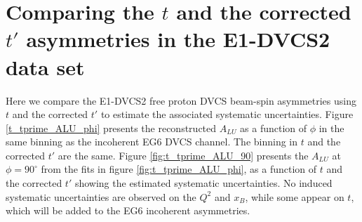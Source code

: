\documentclass[a4paper,11pt,twoside]{article}
\begin{document}
\section{Comparing the $t$ and the corrected $t'$ asymmetries in the E1-DVCS2 
data set}
Here we compare the E1-DVCS2 free proton DVCS beam-spin asymmetries using $t$ 
and the corrected $t'$ to estimate the associated systematic uncertainties.  
Figure \ref{t_tprime_ALU_phi} presents the reconstructed $A_{LU}$ as a function 
of $\phi$ in the same binning as the incoherent EG6 DVCS channel. The binning 
in $t$ and the corrected $t'$ are the same. Figure \ref{fig:t_tprime_ALU_90} 
presents the $A_{LU}$ at $\phi = 90^{\circ}$ from the fits in figure 
\ref{fig:t_tprime_ALU_phi}, as a function of $t$ and the corrected $t'$ showing 
the estimated systematic uncertainties. No induced systematic uncertainties are 
observed on the $Q^{2}$ and $x_B$, while some appear on $t$, which will be 
added to the EG6 incoherent asymmetries. 
\end{document}
